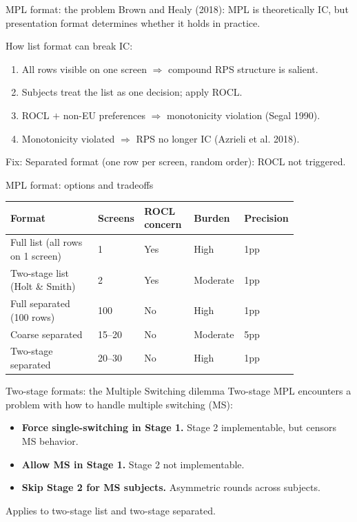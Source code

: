 \documentclass[11pt,aspectratio=169]{beamer}
\begin{document}
\begin{frame}{MPL format: the problem}
Brown and Healy (2018): MPL is theoretically IC, but presentation format determines whether it holds in practice.

\vspace{0.7em}
How list format can break IC:
\begin{enumerate}
\item All rows visible on one screen $\Rightarrow$ compound RPS structure is salient.
\item Subjects treat the list as one decision; apply ROCL.
\item ROCL $+$ non-EU preferences $\Rightarrow$ monotonicity violation (Segal 1990).
\item Monotonicity violated $\Rightarrow$ RPS no longer IC (Azrieli et al. 2018).
\end{enumerate}

\vspace{0.6em}
Fix: Separated format (one row per screen, random order): ROCL not triggered.
\end{frame}

\begin{frame}{MPL format: options and tradeoffs}

\vspace{0.6em}
\small
\setlength{\tabcolsep}{4pt}
\begin{tabular}{@{}p{0.30\linewidth} p{0.10\linewidth} p{0.17\linewidth} p{0.14\linewidth} p{0.12\linewidth}@{}}
\toprule
Format & Screens & ROCL concern & Burden & Precision \\
\midrule
Full list (all rows on 1 screen) & 1 & Yes & High & 1pp \\
Two-stage list (Holt \& Smith) & 2 & Yes & Moderate & 1pp \\
Full separated (100 rows) & 100 & No & High & 1pp \\
Coarse separated & 15--20 & No & Moderate & 5pp \\
Two-stage separated & 20--30 & No & High & 1pp \\
\bottomrule
\end{tabular}


\end{frame}

\begin{frame}{Two-stage formats: the Multiple Switching dilemma}
Two-stage MPL encounters a problem with how to handle multiple switching (MS):

\vspace{0.5em}
\begin{itemize}
\item \textbf{Force single-switching in Stage 1.} Stage 2 implementable, but censors MS behavior.
\item \textbf{Allow MS in Stage 1.} Stage 2 not implementable.
\item \textbf{Skip Stage 2 for MS subjects.} Asymmetric rounds across subjects.
\end{itemize}

\vspace{0.5em}
\footnotesize
Applies to two-stage list and two-stage separated.
\end{frame}
\end{document}
